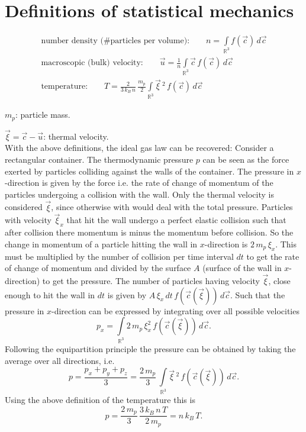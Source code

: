 \section{Definitions of statistical mechanics}

\begin{eqnarray}
 \mbox{number density (\#particles per volume):} \quad \quad n = \int \limits_{\mathbb{R}^3}  f(\vec c) \, d\vec c  \nonumber \\
 \mbox{macroscopic (bulk) velocity:} \quad \quad \vec u = \frac{1}{n} \int \limits_{\mathbb{R}^3} \vec c \, f(\vec c) \, d\vec c \label{DEF}\\
 \mbox{temperature:} \quad \quad T = \frac{2}{3 \, k_B \, n} \, \frac{m_p}{2} \int \limits_{\mathbb{R}^3}  \vec \xi\, ^2\, f(\vec c) \, d\vec c  \nonumber
\end{eqnarray}

$m_p$: particle mass.\par
$\vec \xi = \vec c - \vec u$: thermal velocity.\\[1ex]
With the above definitions, the ideal gas law can be recovered:
Consider a rectangular container. The thermodynamic pressure $p$ can be seen as the force exerted by particles colliding against the walls of the container. The pressure in $x$-direction is given by the force i.e. the rate of change of momentum of the particles undergoing a collision with the wall. Only the thermal velocity is considered $\vec \xi$, since otherwise with would deal with the total pressure. Particles with velocity $\vec \xi_x$ that hit the wall undergo a perfect elastic collision such that after collision there momentum is minus the momentum before collision. So the change in momentum of a particle hitting the wall in $x$-direction is $2\, m_p \, \xi_x$. This must be multiplied by the number of collision per time interval $dt$ to get the rate of change of momentum and divided by the surface $A$ (surface of the wall in $x$-direction) to get the pressure. The number of particles having velocity $\vec \xi$, close enough to hit the wall in $dt$ is given by $A\,\xi_x \, dt \,  f(\vec c(\vec \xi)) \, d\vec c$. Such that the pressure in $x$-direction can be expressed by integrating over all possible velocities
\begin{equation}
 p_x =  \int \limits_{\mathbb{R}^3} 2\, m_p \,  \xi_x ^2 \,f(\vec c(\vec \xi)) \, d\vec c.\nonumber
\end{equation}
Following the equipartition principle the pressure can be obtained by taking the average over all directions, i.e.
\begin{equation}
 p =  \frac{p_x+p_y+p_z}{3} = \frac{2\, m_p}{3} \, \int \limits_{\mathbb{R}^3}   \vec \xi\,^2 \,f(\vec c(\vec \xi)) \, d\vec c.\nonumber
\end{equation}
Using the above definition of the temperature this is
\begin{equation}
 p =   \frac{2\, m_p}{3} \, \frac{3 \, k_B \, n\, T}{2\, m_p} =  n \, k_B \, T.\nonumber
\end{equation}

